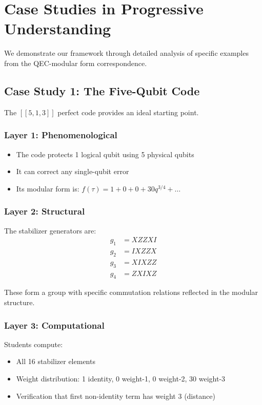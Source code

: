 \documentclass[11pt,a4paper]{article}
\begin{document}
\section{Case Studies in Progressive Understanding}

We demonstrate our framework through detailed analysis of specific examples from the QEC-modular form correspondence.

\subsection{Case Study 1: The Five-Qubit Code}

The $[[5,1,3]]$ perfect code provides an ideal starting point.

\subsubsection{Layer 1: Phenomenological}
\begin{itemize}
\item The code protects 1 logical qubit using 5 physical qubits
\item It can correct any single-qubit error
\item Its modular form is: $f(\tau) = 1 + 0 + 0 + 30q^{3/4} + \ldots$
\end{itemize}

\subsubsection{Layer 2: Structural}
The stabilizer generators are:
\begin{align}
g_1 &= XZZXI \\
g_2 &= IXZZX \\
g_3 &= XIXZZ \\
g_4 &= ZXIXZ
\end{align}

These form a group with specific commutation relations reflected in the modular structure.

\subsubsection{Layer 3: Computational}
Students compute:
\begin{itemize}
\item All 16 stabilizer elements
\item Weight distribution: 1 identity, 0 weight-1, 0 weight-2, 30 weight-3
\item Verification that first non-identity term has weight 3 (distance)
\end{itemize}
\end{document}
